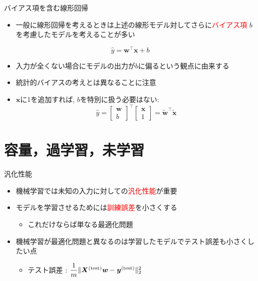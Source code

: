 \documentclass[dvipdfmx, 10pt]{beamer}
\newcommand{\green}[1]{\textcolor{green!40!black}{#1}}
\begin{document}

\begin{frame}{バイアス項を含む線形回帰}
  \begin{itemize}
    \item 一般に線形回帰を考えるときは上述の線形モデル対してさらに\textcolor{red}{バイアス項} $b$ を考慮したモデルを考えることが多い
  \end{itemize}
  \begin{equation}
    \hat{y} = \bm{w} ^ {\top} \bm{x} + b
  \end{equation}
  \begin{itemize}
    \item 入力が全くない場合にモデルの出力が$b$に偏るという観点に由来する
    \item 統計的バイアスの考えとは異なることに注意
	\item $\bm x$に1を追加すれば, $b$を特別に扱う必要はない:
	\[
    \hat{y} = 
	\left[\begin{array}{c}
	\bm{w}\\
	b
	\end{array}\right]^\top 
	\left[\begin{array}{c}
	\bm{x}\\
	1
	\end{array}\right]
	=\tilde{\bm w}^\top \tilde{\bm x}
	\]
  \end{itemize}
\end{frame}


\section{容量，過学習，未学習}


\begin{frame}{汎化性能}
  \begin{itemize}
    \item 機械学習では未知の入力に対しての\textcolor{red}{汎化性能}が重要
    \item モデルを学習させるためには\textcolor{red}{訓練誤差}を小さくする
    \begin{itemize}
      \item これだけならば単なる最適化問題
    \end{itemize}
    \item 機械学習が最適化問題と異なるのは学習したモデルでテスト誤差も小さくしたい点
    \begin{itemize}
      \item テスト誤差 : $\dfrac{1} {m} \| \bm{X} ^ {\rm (test)} \bm{w} - \bm{y} ^ {\rm (test)} \| _{2}^{2}$
    \end{itemize}
  \end{itemize}
\end{frame}
\end{document}

